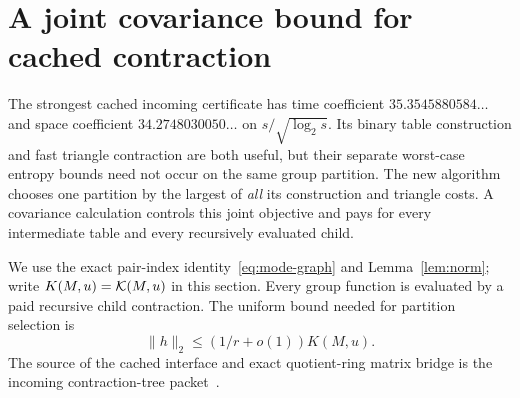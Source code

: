 \section{A joint covariance bound for cached contraction}
\label{sec:joint-objective}

The strongest cached incoming certificate has time coefficient
$35.3545880584\ldots$ and space coefficient $34.2748030050\ldots$ on
$s/\sqrt{\log_2s}$.  Its binary table construction and fast triangle
contraction are both useful, but their separate worst-case entropy bounds
need not occur on the same group partition.  The new algorithm chooses
one partition by the largest of \emph{all} its construction and triangle
costs.  A covariance calculation controls this joint objective and pays
for every intermediate table and every recursively evaluated child.

We use the exact pair-index identity~\eqref{eq:mode-graph} and
Lemma~\ref{lem:norm}; write $K(M,u)=\mathcal K(M,u)$ in this section.
Every group function is evaluated by a paid recursive child contraction.
The uniform bound needed for partition selection is
\begin{equation}\label{eq:joint-entropy-norm}
 \|h\|_2\le(1/r+o(1))K(M,u).
\end{equation}
The source of the cached interface and exact quotient-ring matrix
bridge is the incoming contraction-tree packet~\cite{incomingtree}.

